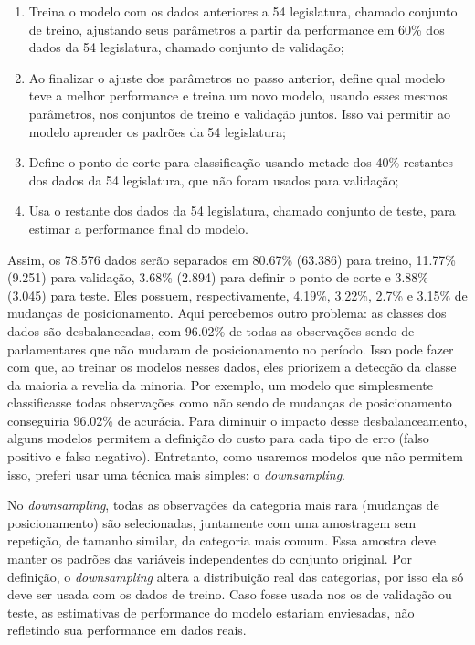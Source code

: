 \documentclass[a4paper,titlepage]{ppgi}\usepackage[]{graphicx}\usepackage[]{color}
\begin{document}
\begin{enumerate}
\item Treina o modelo com os dados anteriores a 54\textordfeminine{}
legislatura, chamado conjunto de treino, ajustando seus parâmetros a partir
da performance em 60\% dos dados da 54\textordfeminine{} legislatura, chamado
conjunto de validação;
\item Ao finalizar o ajuste dos parâmetros no passo anterior, define qual
modelo teve a melhor performance e treina um novo modelo, usando esses mesmos
parâmetros, nos conjuntos de treino e validação juntos. Isso vai permitir ao
modelo aprender os padrões da 54\textordfeminine{} legislatura;
\item Define o ponto de corte para classificação usando metade dos 40\%
restantes dos dados da 54\textordfeminine{} legislatura, que não foram usados
para validação;
\item Usa o restante dos dados da 54\textordfeminine{} legislatura, chamado
conjunto de teste, para estimar a performance final do modelo.
\end{enumerate}

Assim, os 78.576 dados serão separados em
80.67\%
(63.386) para treino,
11.77\%
(9.251) para validação,
3.68\%
(2.894) para definir o ponto de corte e
3.88\% (3.045) para
teste. Eles possuem, respectivamente,
4.19\%,
3.22\%,
2.7\% e
3.15\% de mudanças de posicionamento.
Aqui percebemos outro problema: as classes dos dados são desbalanceadas, com
96.02\% de todas as observações sendo de
parlamentares que não mudaram de posicionamento no período. Isso pode fazer com
que, ao treinar os modelos nesses dados, eles priorizem a detecção da classe da
maioria a revelia da minoria. Por exemplo, um modelo que simplesmente
classificasse todas observações como não sendo de mudanças de posicionamento
conseguiria 96.02\% de acurácia.  Para
diminuir o impacto desse desbalanceamento, alguns modelos permitem a definição
do custo para cada tipo de erro (falso positivo e falso negativo). Entretanto,
como usaremos modelos que não permitem isso, preferi usar uma técnica mais
simples: o \emph{downsampling}.

No \emph{downsampling}, todas as observações da categoria mais rara (mudanças de
posicionamento) são selecionadas, juntamente com uma amostragem sem repetição,
de tamanho similar, da categoria mais comum. Essa amostra deve manter os padrões
das variáveis independentes do conjunto original. Por definição, o
\emph{downsampling} altera a distribuição real das categorias, por isso ela só
deve ser usada com os dados de treino. Caso fosse usada nos os de validação ou
teste, as estimativas de performance do modelo estariam enviesadas, não
refletindo sua performance em dados reais.
\end{document}
